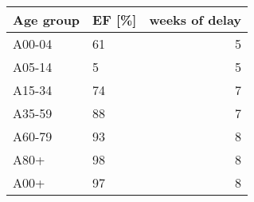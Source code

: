 \begin{tabular}{llr}
\toprule
Age group & EF [\%] &  weeks of delay \\
\midrule
   A00-04 &     61 &               5 \\
   A05-14 &      5 &               5 \\
   A15-34 &     74 &               7 \\
   A35-59 &     88 &               7 \\
   A60-79 &     93 &               8 \\
     A80+ &     98 &               8 \\
     A00+ &     97 &               8 \\
\bottomrule
\end{tabular}

